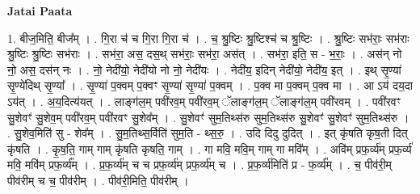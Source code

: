 \documentclass[17pt]{extarticle}
\begin{document}
\textbf{Jatai Paata} \newline

1. बीज॒मिति॒ बीज᳚म् । . गि॒रा च॑ च गि॒रा गि॒रा च॑ । . च॒ श्रु॒ष्टिः श्रु॒ष्टिश्च॑ च श्रु॒ष्टिः । . श्रु॒ष्टिः सभ॑राः॒ सभ॑राः श्रु॒ष्टिः श्रु॒ष्टिः सभ॑राः । . सभ॑रा॒ अस॒ दस॒थ् सभ॑राः॒ सभ॑रा॒ अस॑त् । . सभ॑रा॒ इति॒ स - भ॒राः॒ । . अस॑न् नो नो॒ अस॒ दस॑न् नः । . नो॒ नेदी॑यो॒ नेदी॑यो नो नो॒ नेदी॑यः । . नेदी॑य॒ इदिन् नेदी॑यो॒ नेदी॑य॒ इत् । . इथ् सृ॒ण्या॑ सृ॒ण्ये॑दिथ् सृ॒ण्या᳚ । . सृ॒ण्या॑ प॒क्वम् प॒क्वꣳ सृ॒ण्या॑ सृ॒ण्या॑ प॒क्वम् । . प॒क्व मा प॒क्वम् प॒क्व मा । . आ ऽय॑ दय॒दा ऽय॑त् । . अ॒य॒दित्य॑यत् । . लाङ्ग॑ल॒म् पवी॑रव॒म् पवी॑रव॒म् ॅलाङ्ग॑ल॒म् ॅलाङ्ग॑ल॒म् पवी॑रवम् । . पवी॑रवꣳ सु॒शेवꣳ॑ सु॒शेव॒म् पवी॑रव॒म् पवी॑रवꣳ सु॒शेव᳚म् । . सु॒शेवꣳ॑ सुम॒तिथ्स॑रु सुम॒तिथ्स॑रु सु॒शेवꣳ॑ सु॒शेवꣳ॑ सुम॒तिथ्स॑रु । . सु॒शेव॒मिति॑ सु - शेव᳚म् । . सु॒म॒तिथ्स॒र्विति॑ सुम॒ति - थ्स॒रु॒ । . उदि दिदु दुदित् । . इत् कृ॑षति कृष॒ती दित् कृ॑षति । . कृ॒ष॒ति॒ गाम् गाम् कृ॑षति कृषति॒ गाम् । . गा मवि॒ मवि॒म् गाम् गा मवि᳚म् । . अवि॑म् प्रफ॒र्व्य॑म् प्रफ॒र्व्य॑ मवि॒ मवि॑म् प्रफ॒र्व्य᳚म् । . प्र॒फ॒र्व्य॑म् च च प्रफ॒र्व्य॑म् प्रफ॒र्व्य॑म् च । . प्र॒फ॒र्व्य॑मिति॑ प्र - फ॒र्व्य᳚म् । . च॒ पीव॑री॒म् पीव॑रीम् च च॒ पीव॑रीम् । . पीव॑री॒मिति॒ पीव॑रीम् । \newline
\end{document}
